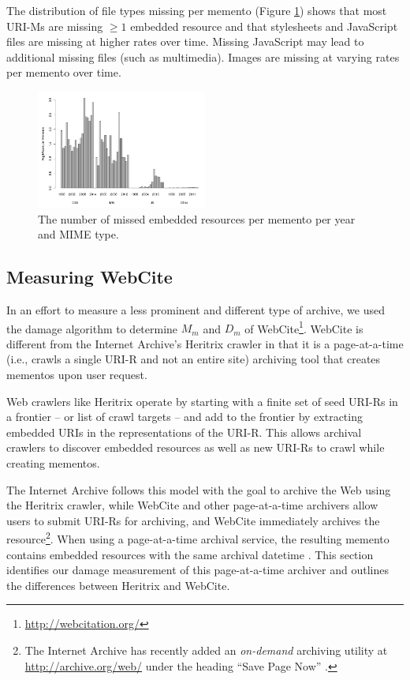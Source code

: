 The distribution of file types missing per memento (Figure \ref{occstats}) shows that most URI-Ms are missing $\ge 1$ embedded resource and that stylesheets and JavaScript files are missing at higher rates over time. Missing JavaScript may lead to additional missing files (such as multimedia). Images are missing at varying rates per memento over time.

\begin{figure}[h!]
\includegraphics[width=0.5\textwidth]{./imgs/fileTypes.png}
\caption{The number of missed embedded resources per memento per year and MIME type.
}
\label{occstats}
\end{figure}



\subsection{Measuring WebCite}
\label{webcite}

In an effort to measure a less prominent and different type of archive, we used the damage algorithm to determine $M_m$ and $D_m$ of WebCite\footnote{\url{http://webcitation.org/}}\cite{webcite}. WebCite is different from the Internet Archive's Heritrix crawler in that it is a page-at-a-time (i.e., crawls a single URI-R and not an entire site) archiving tool that creates mementos upon user request. 

Web crawlers like Heritrix operate by starting with a finite set of seed URI-Rs in a frontier -- or list of crawl targets -- and add to the frontier by extracting embedded URIs in the representations of the URI-R. This allows archival crawlers to discover embedded resources as well as new URI-Rs to crawl while creating mementos. 

The Internet Archive follows this model with the goal to archive the Web using the Heritrix crawler, while WebCite and other page-at-a-time archivers allow users to submit URI-Rs for archiving, and WebCite immediately archives the resource\footnote{The Internet Archive has recently added an \emph{on-demand} archiving utility at \url{http://archive.org/web/} under the heading ``Save Page Now'' \cite{savePage}.}. When using a page-at-a-time archival service, the resulting memento contains embedded resources with the same archival datetime \cite{temporalCoherence}. This section identifies our damage measurement of this page-at-a-time archiver and outlines the differences between Heritrix and WebCite. 

